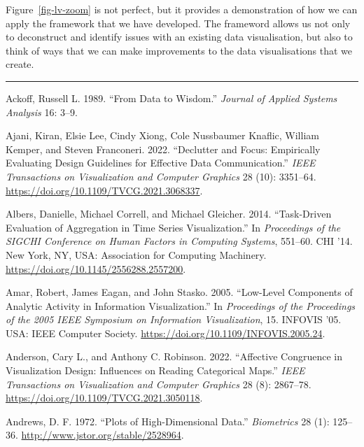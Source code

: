 \documentclass[
  letterpaper,
  DIV=11,
  numbers=noendperiod]{scrreprt}
\newlength{\cslhangindent}
\newenvironment{CSLReferences}[2] %
 {\begin{list}{}{%
  \setlength{\itemindent}{0pt}
  \setlength{\leftmargin}{0pt}
  \setlength{\parsep}{0pt}
  \ifodd #1
   \setlength{\leftmargin}{\cslhangindent}
   \setlength{\itemindent}{-1\cslhangindent}
  \fi
  \setlength{\itemsep}{#2\baselineskip}}}
 {\end{list}}
\begin{document}
Figure~\ref{fig-lv-zoom} is not perfect, but it provides a demonstration
of how we can apply the framework that we have developed. The frameword
allows us not only to deconstruct and identify issues with an existing
data visualisation, but also to think of ways that we can make
improvements to the data visualisations that we create.

\begin{center}\rule{0.5\linewidth}{0.5pt}\end{center}

\theendnotes

\label{refs}
\begin{CSLReferences}{1}{0}
Ackoff, Russell L. 1989. {``From Data to Wisdom.''} \emph{Journal of
Applied Systems Analysis} 16: 3--9.

Ajani, Kiran, Elsie Lee, Cindy Xiong, Cole Nussbaumer Knaflic, William
Kemper, and Steven Franconeri. 2022. {``Declutter and Focus: Empirically
Evaluating Design Guidelines for Effective Data Communication.''}
\emph{IEEE Transactions on Visualization and Computer Graphics} 28 (10):
3351--64. \url{https://doi.org/10.1109/TVCG.2021.3068337}.

Albers, Danielle, Michael Correll, and Michael Gleicher. 2014.
{``Task-Driven Evaluation of Aggregation in Time Series
Visualization.''} In \emph{Proceedings of the SIGCHI Conference on Human
Factors in Computing Systems}, 551--60. CHI '14. New York, NY, USA:
Association for Computing Machinery.
\url{https://doi.org/10.1145/2556288.2557200}.

Amar, Robert, James Eagan, and John Stasko. 2005. {``Low-Level
Components of Analytic Activity in Information Visualization.''} In
\emph{Proceedings of the Proceedings of the 2005 IEEE Symposium on
Information Visualization}, 15. INFOVIS '05. USA: IEEE Computer Society.
\url{https://doi.org/10.1109/INFOVIS.2005.24}.

Anderson, Cary L., and Anthony C. Robinson. 2022. {``Affective
Congruence in Visualization Design: Influences on Reading Categorical
Maps.''} \emph{IEEE Transactions on Visualization and Computer Graphics}
28 (8): 2867--78. \url{https://doi.org/10.1109/TVCG.2021.3050118}.

Andrews, D. F. 1972. {``Plots of High-Dimensional Data.''}
\emph{Biometrics} 28 (1): 125--36.
\url{http://www.jstor.org/stable/2528964}.


\end{CSLReferences}
\end{document}
